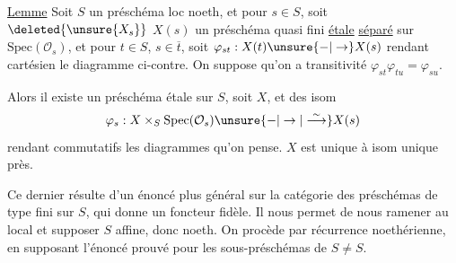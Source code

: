  \uline{Lemme} Soit $S$ un préschéma loc noeth, et
pour  $s\in S$, soit $\deleted{\unsure{X_s}}$ $X(s)$ un préschéma
quasi fini \uline{étale} \uline{séparé} sur $\mathrm{Spec}(\mathcal O_s)$, et pour
$t\in S$, $s\in\overline t$, soit $\varphi_{st}:X(t)\unsure{-|\to}X(s)$ rendant
cartésien le diagramme ci-contre. On suppose qu'on a transitivité
$\varphi_{st}\varphi_{tu}=\varphi_{su}$.

 Alors il existe un préschéma
étale  sur $S$, soit $X$, et des isom
\[
\varphi_s:X\times_S\mathrm{Spec}(\mathcal O_s)\unsure{-|\to|\overset{\sim}{\longrightarrow}}X(s)
\]
rendant commutatifs les diagrammes qu'on pense.
$X$ est unique à isom unique près.

Ce dernier  résulte d'un
énoncé plus général sur la catégorie des
préschémas de type fini sur $S$, qui donne
un foncteur  fidèle. Il nous permet
de nous ramener au local et supposer $S$
affine, donc noeth. On procède par
récurrence noethérienne, en supposant l'énoncé
prouvé pour les sous-préschémas  de
$S\ne S$.
